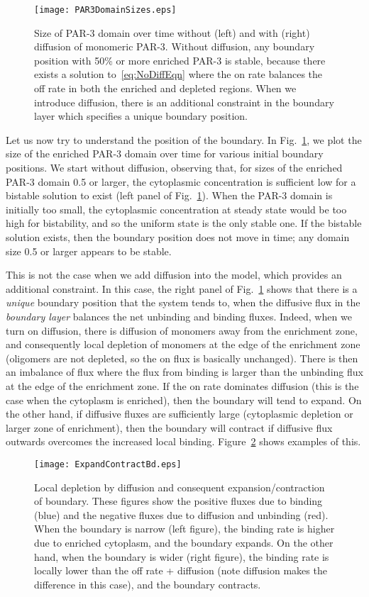\documentclass[11pt]{article}
\newcommand{\6}[1]{#1_{\text{6}}}
\newcommand{\3}[1]{#1_{\text{3}}}
\begin{document}
\begin{figure}
\centering
\texttt{[image: PAR3DomainSizes.eps]}
\caption{\label{fig:WWoDiff}Size of PAR-3 domain over time without (left) and with (right) diffusion of monomeric PAR-3. Without diffusion, any boundary position with 50\% or more enriched PAR-3 is stable, because there exists a solution to\ \eqref{eq:NoDiffEqn} where the on rate balances the off rate in both the enriched and depleted regions. When we introduce diffusion, there is an additional constraint in the boundary layer which specifies a unique boundary position.}
\end{figure}

Let us now try to understand the position of the boundary. In Fig.\ \ref{fig:WWoDiff}, we plot the size of the enriched PAR-3 domain over time for various initial boundary positions. We start without diffusion, observing that, for sizes of the enriched PAR-3 domain 0.5 or larger, the cytoplasmic concentration is sufficient low for a bistable solution to exist (left panel of Fig.\ \ref{fig:WWoDiff}). When the PAR-3 domain is initially too small, the cytoplasmic concentration at steady state would be too high for bistability, and so the uniform state is the only stable one. If the bistable solution exists, then the boundary position does not move in time; any domain size 0.5 or larger appears to be stable.

This is not the case when we add diffusion into the model, which provides an additional constraint. In this case, the right panel of Fig.\ \ref{fig:WWoDiff} shows that there is a \emph{unique} boundary position that the system tends to, when the diffusive flux in the \emph{boundary layer} balances the net unbinding and binding fluxes. Indeed, when we turn on diffusion, there is diffusion of monomers away from the enrichment zone, and consequently local depletion of monomers at the edge of the enrichment zone (oligomers are not depleted, so the on flux is basically unchanged). There is then an imbalance of flux where the flux from binding is larger than the unbinding flux at the edge of the enrichment zone. If the on rate dominates diffusion (this is the case when the cytoplasm is enriched), then the boundary will tend to expand. On the other hand, if diffusive fluxes are sufficiently large (cytoplasmic depletion or larger zone of enrichment), then the boundary will contract if diffusive flux outwards overcomes the increased local binding. Figure\ \ref{fig:ExpContrBd} shows examples of this.

\begin{figure}
\centering
\texttt{[image: ExpandContractBd.eps]}
\caption{\label{fig:ExpContrBd}Local depletion by diffusion and consequent expansion/contraction of boundary. These figures show the positive fluxes due to binding (blue) and the negative fluxes due to diffusion and unbinding (red). When the boundary is narrow (left figure), the binding rate is higher due to enriched cytoplasm, and the boundary expands. On the other hand, when the boundary is wider (right figure), the binding rate is locally lower than the off rate + diffusion (note diffusion makes the difference in this case), and the boundary contracts. }
\end{figure}
\end{document}
